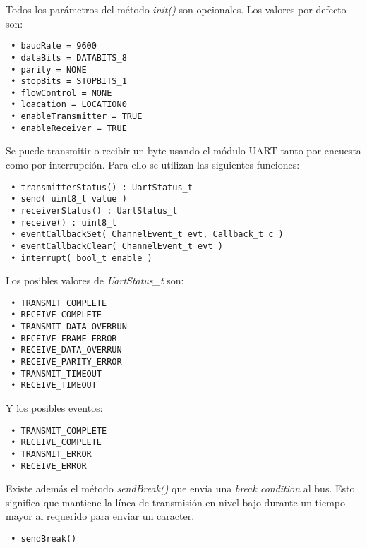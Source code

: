 Todos los parámetros del método \emph{init()} son opcionales. Los valores por defecto son:

\begin{verbatim}
 • baudRate = 9600
 • dataBits = DATABITS_8
 • parity = NONE
 • stopBits = STOPBITS_1
 • flowControl = NONE
 • loacation = LOCATION0
 • enableTransmitter = TRUE
 • enableReceiver = TRUE
\end{verbatim}

Se puede transmitir o recibir un byte usando el módulo UART tanto por encuesta como por interrupción. Para ello se utilizan las siguientes funciones:

\begin{verbatim}
 • transmitterStatus() : UartStatus_t
 • send( uint8_t value )
 • receiverStatus() : UartStatus_t
 • receive() : uint8_t
 • eventCallbackSet( ChannelEvent_t evt, Callback_t c )
 • eventCallbackClear( ChannelEvent_t evt )
 • interrupt( bool_t enable )
\end{verbatim}

Los posibles valores de \emph{UartStatus\_t} son:


\begin{verbatim}
 • TRANSMIT_COMPLETE
 • RECEIVE_COMPLETE
 • TRANSMIT_DATA_OVERRUN
 • RECEIVE_FRAME_ERROR
 • RECEIVE_DATA_OVERRUN
 • RECEIVE_PARITY_ERROR
 • TRANSMIT_TIMEOUT
 • RECEIVE_TIMEOUT
\end{verbatim}

Y los posibles eventos:


\begin{verbatim}
 • TRANSMIT_COMPLETE
 • RECEIVE_COMPLETE
 • TRANSMIT_ERROR
 • RECEIVE_ERROR
\end{verbatim}

Existe además el método \emph{sendBreak()} que envía una \emph{break condition} al bus. Esto significa que mantiene la línea de transmisión en nivel bajo durante un tiempo mayor al requerido para enviar un caracter.

\begin{verbatim}
 • sendBreak()
\end{verbatim}

